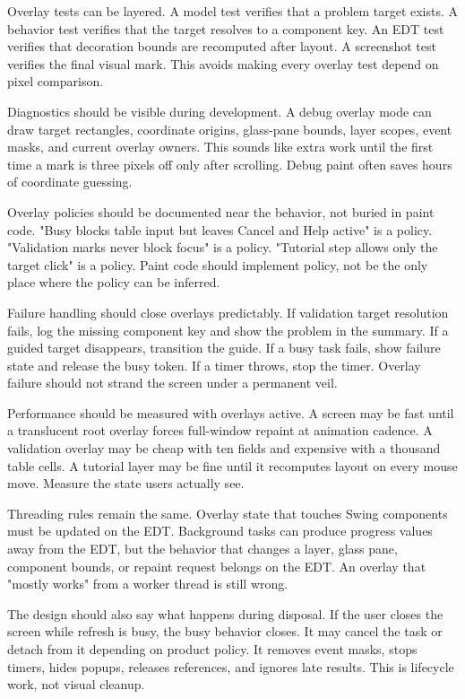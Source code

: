 Overlay tests can be layered. A model test verifies that a problem target exists. A behavior test verifies that the target resolves to a component key. An EDT test verifies that decoration bounds are recomputed after layout. A screenshot test verifies the final visual mark. This avoids making every overlay test depend on pixel comparison.

Diagnostics should be visible during development. A debug overlay mode can draw target rectangles, coordinate origins, glass-pane bounds, layer scopes, event masks, and current overlay owners. This sounds like extra work until the first time a mark is three pixels off only after scrolling. Debug paint often saves hours of coordinate guessing.

Overlay policies should be documented near the behavior, not buried in paint code. "Busy blocks table input but leaves Cancel and Help active" is a policy. "Validation marks never block focus" is a policy. "Tutorial step allows only the target click" is a policy. Paint code should implement policy, not be the only place where the policy can be inferred.

Failure handling should close overlays predictably. If validation target resolution fails, log the missing component key and show the problem in the summary. If a guided target disappears, transition the guide. If a busy task fails, show failure state and release the busy token. If a timer throws, stop the timer. Overlay failure should not strand the screen under a permanent veil.

Performance should be measured with overlays active. A screen may be fast until a translucent root overlay forces full-window repaint at animation cadence. A validation overlay may be cheap with ten fields and expensive with a thousand table cells. A tutorial layer may be fine until it recomputes layout on every mouse move. Measure the state users actually see.

Threading rules remain the same. Overlay state that touches Swing components must be updated on the EDT. Background tasks can produce progress values away from the EDT, but the behavior that changes a layer, glass pane, component bounds, or repaint request belongs on the EDT. An overlay that "mostly works" from a worker thread is still wrong.

The design should also say what happens during disposal. If the user closes the screen while refresh is busy, the busy behavior closes. It may cancel the task or detach from it depending on product policy. It removes event masks, stops timers, hides popups, releases references, and ignores late results. This is lifecycle work, not visual cleanup.

